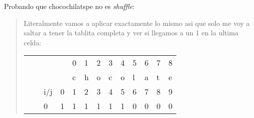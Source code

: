 \textcolor{bibi}{Probando que chocochilatspe no es \textit{shuffle}:}\vspace{.2cm}
\begin{quote}
    Literalmente vamos a aplicar exactamente lo mismo asi que solo me voy a saltar a tener la tablita completa y ver si llegamos a un 1 en la ultima celda: \vspace{.2cm}

    \begin{table}[H]
        \centering
        \begin{tabular}{lllllllllllll}
            &   &                        &                                                & 0                                              & 1                                              & 2                                              & 3                                              & 4                                              & 5                                              & 6                                              & 7                                              & 8                                              \\
            &   &                        &                                                & c                                              & h                                              & o                                              & c                                              & o                                              & l                                              & a                                              & t                                              & e                                              \\
            &   & i/j                    & 0                                              & 1                                              & 2                                              & 3                                              & 4                                              & 5                                              & 6                                              & 7                                              & 8                                              & 9                                              \\ \cline{4-13} 
            &   & \multicolumn{1}{l|}{0} & \multicolumn{1}{l|}{\cellcolor[HTML]{FFFFFF}1} & \multicolumn{1}{l|}{\cellcolor[HTML]{FFFFFF}1} & \multicolumn{1}{l|}{\cellcolor[HTML]{FFFFFF}1} & \multicolumn{1}{l|}{\cellcolor[HTML]{FFFFFF}1} & \multicolumn{1}{l|}{\cellcolor[HTML]{FFFFFF}1} & \multicolumn{1}{l|}{\cellcolor[HTML]{FFFFFF}1} & \multicolumn{1}{l|}{\cellcolor[HTML]{FFFFFF}0} & \multicolumn{1}{l|}{\cellcolor[HTML]{FFFFFF}0} & \multicolumn{1}{l|}{\cellcolor[HTML]{FFFFFF}0} & \multicolumn{1}{l|}{\cellcolor[HTML]{FFFFFF}0} \\ \cline{4-13} 

\end{tabular}
\end{table}
\end{quote}
